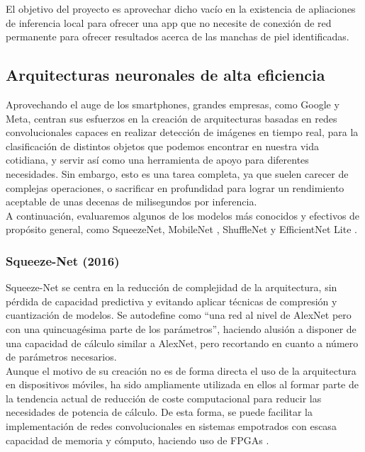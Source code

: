 El objetivo del proyecto es aprovechar dicho vacío en la existencia de apliaciones de inferencia local para ofrecer una app que no necesite de conexión de red permanente para ofrecer resultados acerca de las manchas de piel identificadas.

\subsection{Arquitecturas neuronales de alta eficiencia}

Aprovechando el auge de los smartphones, grandes empresas, como Google y Meta, centran sus esfuerzos en la creación de arquitecturas basadas en redes convolucionales capaces en realizar detección de imágenes en tiempo real, para la clasificación de distintos objetos que podemos encontrar en nuestra vida cotidiana, y servir así como una herramienta de apoyo para diferentes necesidades. Sin embargo, esto es una tarea completa, ya que suelen carecer de complejas operaciones, o sacrificar en profundidad para lograr un rendimiento aceptable de unas decenas de milisegundos por inferencia.\\

A continuación, evaluaremos algunos de los modelos más conocidos y efectivos de propósito general, como SqueezeNet\cite{iandola2016squeezenet}, MobileNet \cite{howard2017mobilenets}\cite{sandler2019mobilenetv2}\cite{howard2019searching}, ShuffleNet \cite{zhang2017shufflenet} y  EfficientNet Lite \cite{tan2020efficientnet}\cite{eflite}.

\subsubsection{Squeeze-Net (2016)}

Squeeze-Net\cite{iandola2016squeezenet} se centra en la reducción de complejidad de la arquitectura, sin pérdida de capacidad predictiva y evitando aplicar técnicas de compresión y cuantización\cite{kuzmin2024fp8} de modelos. Se autodefine como ``una red al nivel de AlexNet\cite{NIPS2012_c399862d} pero con una quincuagésima parte de los parámetros'', haciendo alusión a disponer de una capacidad de cálculo similar a AlexNet, pero recortando en cuanto a número de parámetros necesarios.\\

Aunque el motivo de su creación no es de forma directa el uso de la arquitectura en dispositivos móviles, ha sido ampliamente utilizada en ellos al formar parte de la tendencia actual de reducción de coste computacional para reducir las necesidades de potencia de cálculo. De esta forma, se puede facilitar la implementación de redes convolucionales en sistemas empotrados con escasa capacidad de memoria y cómputo, haciendo uso de FPGAs \cite{fpga}.\\

